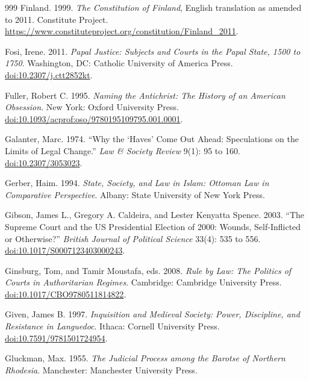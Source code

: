 \documentclass[11pt,letterpaper]{article}
\theoremstyle{definition}
\theoremstyle{remark}
\begin{document}
\begin{thebibliography}{999}
Finland. 1999. \emph{The Constitution of Finland}, English translation as amended to 2011. Constitute Project. \url{https://www.constituteproject.org/constitution/Finland_2011}.

Fosi, Irene. 2011. \emph{Papal Justice: Subjects and Courts in the Papal State, 1500 to 1750}. Washington, DC: Catholic University of America Press. \href{https://doi.org/10.2307/j.ctt2852kt}{doi:10.2307/j.ctt2852kt}.

Fuller, Robert C. 1995. \emph{Naming the Antichrist: The History of an American Obsession}. New York: Oxford University Press. \href{https://doi.org/10.1093/acprof:oso/9780195109795.001.0001}{doi:10.1093/acprof:oso/9780195109795.001.0001}.

Galanter, Marc. 1974. ``Why the `Haves' Come Out Ahead: Speculations on the Limits of Legal Change.'' \emph{Law \& Society Review} 9(1): 95 to 160. \href{https://doi.org/10.2307/3053023}{doi:10.2307/3053023}.

Gerber, Haim. 1994. \emph{State, Society, and Law in Islam: Ottoman Law in Comparative Perspective}. Albany: State University of New York Press.

Gibson, James L., Gregory A. Caldeira, and Lester Kenyatta Spence. 2003. ``The Supreme Court and the US Presidential Election of 2000: Wounds, Self-Inflicted or Otherwise?'' \emph{British Journal of Political Science} 33(4): 535 to 556. \href{https://doi.org/10.1017/S0007123403000243}{doi:10.1017/S0007123403000243}.

Ginsburg, Tom, and Tamir Moustafa, eds. 2008. \emph{Rule by Law: The Politics of Courts in Authoritarian Regimes}. Cambridge: Cambridge University Press. \href{https://doi.org/10.1017/CBO9780511814822}{doi:10.1017/CBO9780511814822}.

Given, James B. 1997. \emph{Inquisition and Medieval Society: Power, Discipline, and Resistance in Languedoc}. Ithaca: Cornell University Press. \href{https://doi.org/10.7591/9781501724954}{doi:10.7591/9781501724954}.

Gluckman, Max. 1955. \emph{The Judicial Process among the Barotse of Northern Rhodesia}. Manchester: Manchester University Press.


\end{thebibliography}
\end{document}
